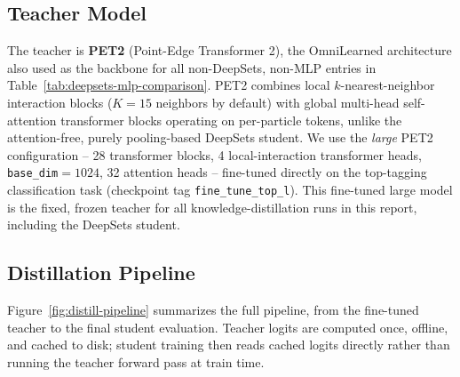 
\subsection{Teacher Model}
\label{sec:teacher}

The teacher is \textbf{PET2} (Point-Edge Transformer 2), the OmniLearned
architecture also used as the backbone for all non-DeepSets, non-MLP entries
in Table~\ref{tab:deepsets-mlp-comparison}. PET2 combines local $k$-nearest-neighbor
interaction blocks ($K=15$ neighbors by default) with global multi-head
self-attention transformer blocks operating on per-particle tokens, unlike the
attention-free, purely pooling-based DeepSets student. We use the
\emph{large} PET2 configuration -- 28 transformer blocks, 4 local-interaction
transformer heads, \texttt{base\_dim}$=1024$, 32 attention heads -- fine-tuned
directly on the top-tagging classification task (checkpoint tag
\texttt{fine\_tune\_top\_l}). This fine-tuned large model is the fixed,
frozen teacher for all knowledge-distillation runs in this report, including
the DeepSets student.

\subsection{Distillation Pipeline}
\label{sec:pipeline}

Figure~\ref{fig:distill-pipeline} summarizes the full pipeline, from the
fine-tuned teacher to the final student evaluation. Teacher logits are
computed once, offline, and cached to disk; student training then reads
cached logits directly rather than running the teacher forward pass at train
time.

